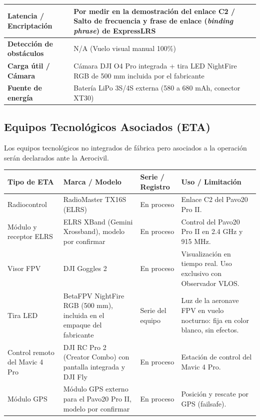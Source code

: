 \begin{table}[H]
\begin{tabular}{|p{5cm}|p{9cm}|}
        \textbf{Latencia / Encriptación} & Por medir en la demostración del enlace C2 / Salto de frecuencia y frase de enlace (\textit{binding phrase}) de ExpressLRS \\ \hline
        \textbf{Detección de obstáculos} & N/A (Vuelo visual manual 100\%) \\ \hline
        \textbf{Carga útil / Cámara} & Cámara DJI O4 Pro integrada + tira LED NightFire RGB de 500 mm incluida por el fabricante \\ \hline
        \textbf{Fuente de energía} & Batería LiPo 3S/4S externa (580 a 680 mAh, conector XT30) \\ \hline
    \end{tabular}
\end{table}

\subsection{Equipos Tecnológicos Asociados (ETA)}
Los equipos tecnológicos no integrados de fábrica pero asociados a la operación serán declarados ante la Aerocivil.

\begin{table}[H]
    \centering
    \renewcommand{\arraystretch}{1.2}
    \begin{tabular}{|p{3cm}|p{3.5cm}|p{3.5cm}|p{4cm}|}
        \hline
        \rowcolor[gray]{0.9} \textbf{Tipo de ETA} & \textbf{Marca / Modelo} & \textbf{Serie / Registro} & \textbf{Uso / Limitación} \\ \hline
        Radiocontrol & RadioMaster TX16S (ELRS) & En proceso & Enlace C2 del Pavo20 Pro II. \\ \hline
        Módulo y receptor ELRS & ELRS XBand (Gemini Xrossband), modelo por confirmar & En proceso & Control del Pavo20 Pro II en 2.4 GHz y 915 MHz. \\ \hline
        Visor FPV & DJI Goggles 2 & En proceso & Visualización en tiempo real. Uso exclusivo con Observador VLOS. \\ \hline
        Tira LED & BetaFPV NightFire RGB (500 mm), incluida en el empaque del fabricante & Serie del equipo & Luz de la aeronave FPV en vuelo nocturno: fija en color blanco, sin efectos. \\ \hline
        Control remoto del Mavic 4 Pro & DJI RC Pro 2 (Creator Combo) con pantalla integrada y DJI Fly & En proceso & Estación de control del Mavic 4 Pro. \\ \hline
        Módulo GPS & Módulo GPS externo para el Pavo20 Pro II, modelo por confirmar & En proceso & Posición y rescate por GPS (failsafe). \\ \hline
    \end{tabular}
\end{table}

